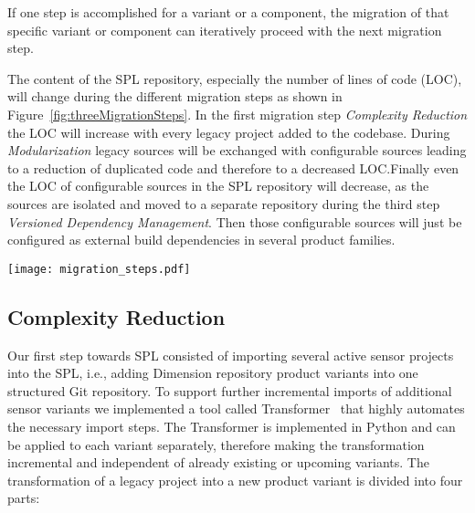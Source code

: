 If one step is accomplished for a variant or a component, the migration of that
specific variant or component can iteratively proceed with the next migration
step.

The content of the SPL repository, especially the number of lines of code (LOC),
will change during the different migration steps as shown in
Figure~\ref{fig:threeMigrationSteps}. In the first migration step
\textit{Complexity Reduction} the LOC will increase with every legacy project
added to the codebase. During \textit{Modularization} legacy sources will be
exchanged with configurable sources leading to a reduction of duplicated code
and therefore to a decreased LOC.\@ Finally even the LOC of configurable sources
in the SPL repository will decrease, as the sources are isolated and moved to a
separate repository during the third step \textit{Versioned Dependency
Management}. Then those configurable sources will just be configured as external
build dependencies in several product families.

\begin{figure*}[ht]
  \centering
  \texttt{[image: migration\_steps.pdf]}
  \caption{Three Migration Steps to SPL}
  \label{fig:threeMigrationSteps}
\end{figure*}

\subsection{Complexity Reduction}\label{complexity}

Our first step towards SPL consisted of importing several active sensor projects
into the SPL, i.e., adding Dimension repository product variants into one
structured Git repository. To support further incremental imports of additional
sensor variants we implemented a tool called
Transformer~\cite{GithubTransformer} that highly automates the necessary import
steps. The Transformer is implemented in Python and can be applied to each
variant separately, therefore making the transformation incremental and
independent of already existing or upcoming variants. The transformation of a
legacy project into a new product variant is divided into four parts:

